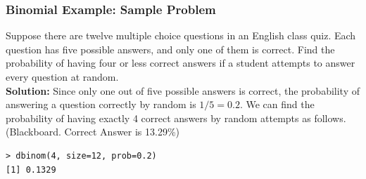 \documentclass[a4]{beamer}
\begin{document}

\begin{frame}[fragile]
\frametitle{Binomial Example: Sample Problem}

Suppose there are twelve multiple choice questions in an English class quiz. Each question has five possible answers, and only one of them is correct. Find the probability of having four or less correct answers if a student attempts to answer every question at random.\\
\bigskip
\textbf{Solution:}
Since only one out of five possible answers is correct, the probability of answering a question correctly by random is $1/5=0.2$. We can find the probability of having exactly 4 correct answers by random attempts as follows.(Blackboard. Correct Answer is 13.29\%)
\begin{verbatim}
> dbinom(4, size=12, prob=0.2)
[1] 0.1329
\end{verbatim}
\end{frame}
\end{document}
